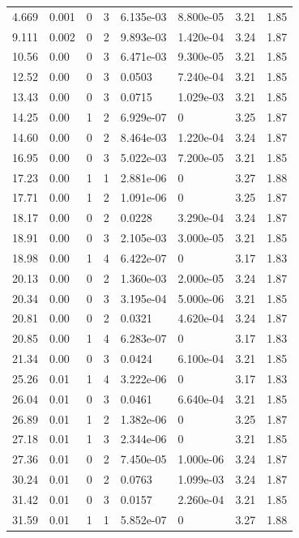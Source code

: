 \documentclass[preview]{standalone}
\begin{document}
{{\begin{tabular}{L{1.2cm}C{1.2cm} C{0.3cm}C{0.5cm} C{1.4cm}C{1.4cm} C{1.4cm}C{1.4cm}}
  4.669  &  0.001  & 0     &  3 &  6.135e-03  & 8.800e-05  & 3.21 &  1.85   \\ 
  9.111  &  0.002  & 0     &  2 &  9.893e-03  & 1.420e-04  & 3.24 &  1.87   \\ 
  10.56  &  0.00  & 0     &  3 &  6.471e-03  & 9.300e-05  & 3.21 &  1.85   \\ 
  12.52  &  0.00  & 0     &  3 &  0.0503  & 7.240e-04  & 3.21 &  1.85   \\ 
  13.43  &  0.00  & 0     &  3 &  0.0715  & 1.029e-03  & 3.21 &  1.85   \\ 
  14.25  &  0.00  & 1     &  2 &  6.929e-07  & 0  & 3.25 &  1.87   \\ 
  14.60  &  0.00  & 0     &  2 &  8.464e-03  & 1.220e-04  & 3.24 &  1.87   \\ 
  16.95  &  0.00  & 0     &  3 &  5.022e-03  & 7.200e-05  & 3.21 &  1.85   \\ 
  17.23  &  0.00  & 1     &  1 &  2.881e-06  & 0  & 3.27 &  1.88   \\ 
  17.71  &  0.00  & 1     &  2 &  1.091e-06  & 0  & 3.25 &  1.87   \\ 
  18.17  &  0.00  & 0     &  2 &  0.0228  & 3.290e-04  & 3.24 &  1.87   \\ 
  18.91  &  0.00  & 0     &  3 &  2.105e-03  & 3.000e-05  & 3.21 &  1.85   \\ 
  18.98  &  0.00  & 1     &  4 &  6.422e-07  & 0  & 3.17 &  1.83   \\ 
  20.13  &  0.00  & 0     &  2 &  1.360e-03  & 2.000e-05  & 3.24 &  1.87   \\ 
  20.34  &  0.00  & 0     &  3 &  3.195e-04  & 5.000e-06  & 3.21 &  1.85   \\ 
  20.81  &  0.00  & 0     &  2 &  0.0321  & 4.620e-04  & 3.24 &  1.87   \\ 
  20.85  &  0.00  & 1     &  4 &  6.283e-07  & 0  & 3.17 &  1.83   \\ 
  21.34  &  0.00  & 0     &  3 &  0.0424  & 6.100e-04  & 3.21 &  1.85   \\ 
  25.26  &  0.01  & 1     &  4 &  3.222e-06  & 0  & 3.17 &  1.83   \\ 
  26.04  &  0.01  & 0     &  3 &  0.0461  & 6.640e-04  & 3.21 &  1.85   \\ 
  26.89  &  0.01  & 1     &  2 &  1.382e-06  & 0  & 3.25 &  1.87   \\ 
  27.18  &  0.01  & 1     &  3 &  2.344e-06  & 0  & 3.21 &  1.85   \\ 
  27.36  &  0.01  & 0     &  2 &  7.450e-05  & 1.000e-06  & 3.24 &  1.87   \\ 
  30.24  &  0.01  & 0     &  2 &  0.0763  & 1.099e-03  & 3.24 &  1.87   \\ 
  31.42  &  0.01  & 0     &  3 &  0.0157  & 2.260e-04  & 3.21 &  1.85   \\ 
  31.59  &  0.01  & 1     &  1 &  5.852e-07  & 0  & 3.27 &  1.88   \\ 
\hline 
\end{tabular} 

}}
\end{document}
